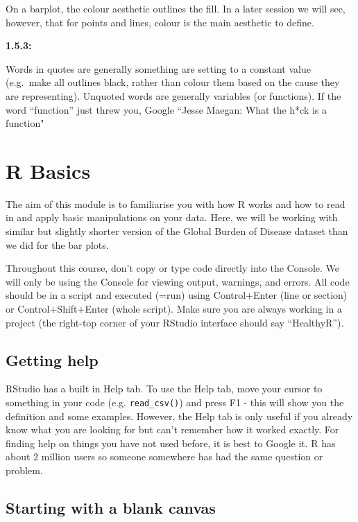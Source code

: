 \documentclass[]{book}
\begin{document}
On a barplot, the colour aesthetic outlines the fill. In a later session
we will see, however, that for points and lines, colour is the main
aesthetic to define.

\textbf{1.5.3:}

Words in quotes are generally something are setting to a constant value
(e.g.~make all outlines black, rather than colour them based on the
cause they are representing). Unquoted words are generally variables (or
functions). If the word ``function'' just threw you, Google ``Jesse
Maegan: What the h*ck is a function"

\chapter{R Basics}\label{r-basics}

The aim of this module is to familiarise you with how R works and how to
read in and apply basic manipulations on your data. Here, we will be
working with similar but slightly shorter version of the Global Burden
of Disease dataset than we did for the bar plots.

Throughout this course, don't copy or type code directly into the
Console. We will only be using the Console for viewing output, warnings,
and errors. All code should be in a script and executed (=run) using
Control+Enter (line or section) or Control+Shift+Enter (whole script).
Make sure you are always working in a project (the right-top corner of
your RStudio interface should say ``HealthyR'').

\section{Getting help}\label{getting-help}

RStudio has a built in Help tab. To use the Help tab, move your cursor
to something in your code (e.g. \texttt{read\_csv()}) and press F1 -
this will show you the definition and some examples. However, the Help
tab is only useful if you already know what you are looking for but
can't remember how it worked exactly. For finding help on things you
have not used before, it is best to Google it. R has about 2 million
users so someone somewhere has had the same question or problem.

\section{Starting with a blank
canvas}\label{starting-with-a-blank-canvas}
\end{document}
